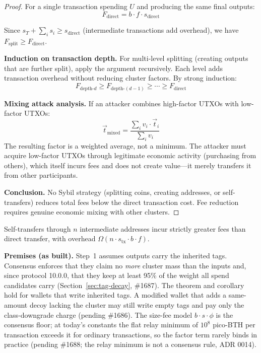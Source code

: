 \begin{proof}
For a single transaction spending $U$ and producing the same final outputs:
\[
F_{\text{direct}} = b \cdot f \cdot s_{\text{direct}}
\]

Since $s_T + \sum_i s_i \geq s_{\text{direct}}$ (intermediate transactions add
overhead), we have $F_{\text{split}} \geq F_{\text{direct}}$.

\textbf{Induction on transaction depth.}
For multi-level splitting (creating outputs that are further split), apply
the argument recursively. Each level adds transaction overhead without
reducing cluster factors. By strong induction:
\[
F_{\text{depth-}d} \geq F_{\text{depth-}(d-1)} \geq \cdots \geq F_{\text{direct}}
\]

\textbf{Mixing attack analysis.}
If an attacker combines high-factor UTXOs with low-factor UTXOs:
\[
\vec{t}_{\text{mixed}} = \frac{\sum_i v_i \cdot \vec{t}_i}{\sum_i v_i}
\]
The resulting factor is a weighted average, not a minimum. The attacker
must acquire low-factor UTXOs through legitimate economic activity (purchasing
from others), which itself incurs fees and does not create value---it merely
transfers it from other participants.

\textbf{Conclusion.}
No Sybil strategy (splitting coins, creating addresses, or self-transfers)
reduces total fees below the direct transaction cost. Fee reduction requires
genuine economic mixing with other clusters.
\end{proof}

\begin{corollary}
Self-transfers through $n$ intermediate addresses incur strictly greater
fees than direct transfer, with overhead $\Omega(n \cdot s_{\text{tx}} \cdot b \cdot f)$.
\end{corollary}

\textbf{Premises (as built).} Step~1 assumes outputs carry the inherited
tags. Consensus enforces that they claim no \emph{more} cluster mass than
the inputs and, since protocol 10.0.0, that they keep at least 95\% of the
weight all spend candidates carry (Section~\ref{sec:tag-decay}, \#1687).
The theorem and corollary hold for wallets that write inherited tags. A
modified wallet that adds a same-amount decoy lacking the cluster may still
write empty tags and pay only the class-downgrade charge (pending \#1686). The
size-fee model $b \cdot s \cdot \phi$ is the consensus floor; at today's
constants the flat relay minimum of $10^{8}$ pico-BTH per transaction exceeds
it for ordinary transactions, so the factor term rarely binds in practice
(pending \#1688; the relay minimum is not a consensus rule, ADR 0014).

